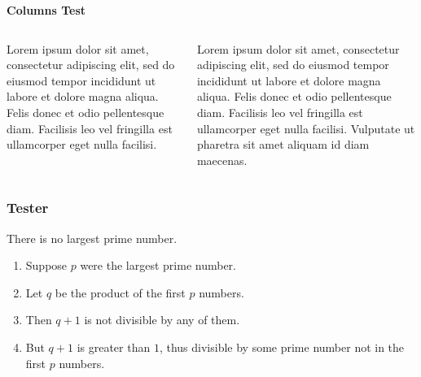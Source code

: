 \documentclass[aspectratio=169, table]{beamer}
\begin{document}
	\begin{frame}{{\huge \textbf{Columns Test}}}
		\begin{tcolorbox}[standard jigsaw, opacityback=0, opacityframe=0, sharp corners, boxrule=0pt]
			\begin{columns}[T] %
				\begin{column}{0.5\textwidth}
					Lorem ipsum dolor sit amet, consectetur adipiscing elit, sed do eiusmod tempor incididunt ut labore et dolore magna aliqua. Felis donec et odio pellentesque diam. Facilisis leo vel fringilla est ullamcorper eget nulla facilisi.
				\end{column}
				\begin{column}{0.5\textwidth}
					Lorem ipsum dolor sit amet, consectetur adipiscing elit, sed do eiusmod tempor incididunt ut labore et dolore magna aliqua. Felis donec et odio pellentesque diam. Facilisis leo vel fringilla est ullamcorper eget nulla facilisi. Vulputate ut pharetra sit amet aliquam id diam maecenas.
				\end{column}
			\end{columns}
		\end{tcolorbox}
	\end{frame}

	\begin{frame} 
		\frametitle{{\huge \textbf{Tester}}} 
		\begin{theorem}
			There is no largest prime number. \end{theorem} 
		\begin{enumerate} 
			\item<1-| alert@1> Suppose $p$ were the largest prime number. 
			\item<2-> Let $q$ be the product of the first $p$ numbers. 
			\item<3-> Then $q+1$ is not divisible by any of them. 
			\item<1-> But $q + 1$ is greater than $1$, thus divisible by some prime
			number not in the first $p$ numbers.
		\end{enumerate}
	\end{frame}
	
\end{document}
